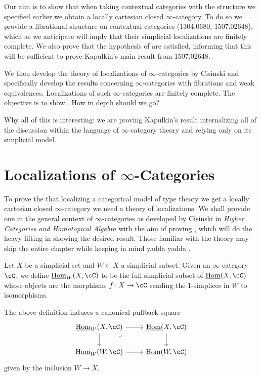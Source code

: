 \documentclass[a4paper,12pt]{scrartcl}
\begin{document}
Our aim is to show that when taking contextual categories with the structure we
specified earlier we obtain a locally cartesian closed $\infty$-category. To do
so we provide a fibrational structure on contextual categories (1304.0680,
1507.02648), which as we anticipate will imply that their simplicial
localizations are finitely complete. We also prove that the hypothesis of
\cite[Thm.\ 7.6.16]{Cis19} are satisfied, informing that this will be sufficient
to prove Kapulkin's main result from 1507.02648.

We then develop the theory of localizations of $\infty$-categories by Cisinski
and specifically develop the results concerning $\infty$-categories with
fibrations and weak equivalences. Localizations of such $\infty$-categories are
finitely complete. The objective is to show \cite[Thm.\ 7.6.16]{Cis19}. How in
depth should we go?

Why all of this is interesting: we are proving Kapulkin's result internalizing
all of the discussion within the language of $\infty$-category theory and
relying only on its simplicial model.

\section{Localizations of \texorpdfstring{$\infty$}{∞}-Categories}

To prove the that localizing a categorical model of type theory we get a locally
cartesian closed $\infty$-category we need a theory of localizations. We shall
provide one in the general context of $\infty$-categories as developed by
Cisinski in \emph{Higher Categories and Homotopical Algebra} with the aim of
proving \cite[Thm.\ 7.6.16]{Cis19}, which will do the heavy lifting in showing
the desired result. Those familiar with the theory may skip the entire chapter
while keeping in mind yadda yadda .

\begin{defn}
  Let $X$ be a simplicial set and $W\subset X$ a simplicial subset. Given an
  $\infty$-category $\cC$, we define $\Home_W(X,\cC)$ to be the full simplicial
  subset of $\Home(X,\cC)$ whose objects are the morphisms $f\colon
  X\rightarrow\cC$ sending the 1-simplices in $W$ to isomorphisms.
\end{defn}

\begin{rmk}
  The above definition induces a canonical pullback square
  \[\begin{tikzcd}
    {\Home_W(X,\cC)} & {\Home(X,\cC)} \\
    {\Home_W(W,\cC)} & {\Home(W,\cC)}
    \arrow[from=1-1, to=2-1]
    \arrow[from=2-1, to=2-2]
    \arrow[from=1-2, to=2-2]
    \arrow[from=1-1, to=1-2]
    \arrow["\lrcorner"{anchor=center, pos=0.125}, draw=none, from=1-1, to=2-2]
  \end{tikzcd}\]
  given by the inclusion $W\rightarrow X$.
\end{rmk}
\end{document}

